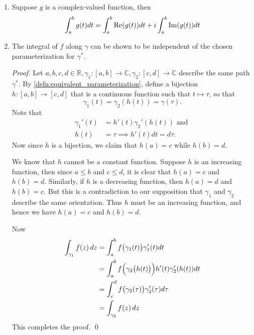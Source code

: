 \documentclass[notoc,notitlepage]{tufte-book}
\begin{document}
\begin{remark}
	\begin{enumerate}
		\item Suppose $g$ is a complex-valued function, then
			\begin{equation*}
				\int_{a}^{b} g(t) dt = \int_{a}^{b} \operatorname{Re}(g(t)) dt + i \int_{a}^{b} \operatorname{Im}(g(t)) dt
			\end{equation*}\label{remark:integral_into_real_and_imaginary_parts}
		\item The integral of $f$ along $\gamma$ can be shown to be independent of the chosen parameterization for $\gamma^*$.

		\begin{proof}
			Let $a, b, c, d \in \mathbb{R}, \gamma_1 : [a, b] \to \mathbb{C}, \gamma_2 : [c, d] \to \mathbb{C}$ describe the same path $\gamma^*$. By \cref{defn:equivalent_parameterization}, define a bijection $h : [a, b] \to [c, d]$ that is a continuous function such that $t \mapsto \tau$, so that
			\begin{equation*}
				\gamma_1(t) = \gamma_2(h(t)) = \gamma(\tau).
			\end{equation*}
			Note that
			\begin{align*}
				\gamma_1'(t) &= h'(t)\gamma_2'(h(t)) \text{ and } \\
				h(t) &= \tau \implies h'(t) dt = d\tau.
			\end{align*}
			Now since $h$ is a bijection, we claim that $h(a) = c$ while $h(b) = d$.

			We know that $h$ cannot be a constant function. Suppose $h$ is an increasing function, then since $a \leq b$ and $c \leq d$, it is clear that $h(a) = c$ and $h(b) = d$. Similarly, if $h$ is a decreasing function, then $h(a) = d$ and $h(b) = c$. But this is a contradiction to our supposition that $\gamma_1$ and $\gamma_2$ describe the same orientation. Thus $h$ must be an increasing function, and hence we have $h(a) = c$ and $h(b) = d$.


			Now
			\begin{align*}
				\int_{\gamma_1} f(z) \mathop{}\!d{z}
					&= \int_{a}^{b} f\big( \gamma_1(t) \big) \gamma_1'(t) dt \\
					&= \int_{a}^{b} f\Big( \gamma_2 \big( h(t) \big) \Big) h'(t) \gamma_2'(h(t)) dt \\
					&= \int_{c}^{d} f\big( \gamma_2(\tau) \big) \gamma_2'(\tau) d\tau \\
					&= \int_{\gamma_2} f(z) \mathop{}\!d{z}
			\end{align*}
			This completes the proof. \qed
		\end{proof}
	\end{enumerate}
\end{remark}
\end{document}

